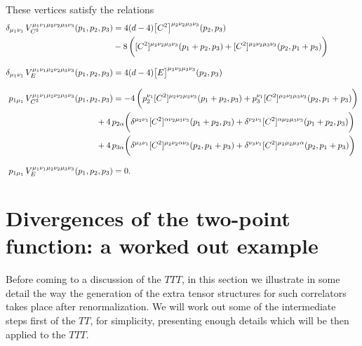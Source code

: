 \documentclass[a4paper,11pt,openright,twoside]{book}
\let\a=\alpha   \let\b=\beta   \let\g=\gamma   \let\d=\delta
\numberwithin{equation}{section}
\begin{document}
{{These vertices satisfy the relations
\begin{align}
	\d_{\mu_1\nu_1}\,V_{C^2}^{\mu_1\nu_1\mu_2\nu_2\mu_3\nu_3}(p_1,p_2,p_3)&=4(d-4)\big[C^2\big]^{\mu_2\nu_2\mu_3\nu_3}(p_2,p_3)\notag\\
	&-8\,\bigg([C^2]^{\mu_2\nu_2\mu_3\nu_3}(p_1+p_2,p_3)+[C^2]^{\mu_2\nu_2\mu_3\nu_3}(p_2,p_1+p_3)\bigg)\\[2ex]
	\d_{\mu_1\nu_1}\,V_{E}^{\mu_1\nu_1\mu_2\nu_2\mu_3\nu_3}(p_1,p_2,p_3)&=4(d-4)\big[E\big]^{\mu_2\nu_2\mu_3\nu_3}(p_2,p_3)\\[2ex]
	p_{1\mu_1}\,V_{C^2}^{\mu_1\nu_1\mu_2\nu_2\mu_3\nu_3}(p_1,p_2,p_3)&=-4\,\bigg(p_2^{\nu_1}[C^2]^{\mu_2\nu_2\mu_3\nu_3}(p_1+p_2,p_3)+p_3^{\nu_1}[C^2]^{\mu_2\nu_2\mu_3\nu_3}(p_2,p_1+p_3)\bigg)\notag\\
	&\hspace{-0.7cm}+4\,p_{2\a}\bigg(\d^{\mu_2\nu_1}[C^2]^{\a\nu_2\mu_3\nu_3}(p_1+p_2,p_3)+\d^{\nu_2\nu_1}[C^2]^{\a\mu_2\mu_3\nu_3}(p_1+p_2,p_3)\bigg)\notag\\
	&\hspace{-0.7cm}+4\,p_{3\a}\bigg(\d^{\mu_3\nu_1}[C^2]^{\mu_2\nu_2\a\nu_3}(p_2,p_1+p_3)+\d^{\nu_3\nu_1}[C^2]^{\mu_2\mu_2\mu_3\a}(p_2,p_1+p_3)\bigg)\\[2ex]
	p_{1\mu_1}\,V_{E}^{\mu_1\nu_1\mu_2\nu_2\mu_3\nu_3}(p_1,p_2,p_3)&=0.
\end{align}


\section{Divergences of the two-point function: a worked out example}
Before coming to a discussion of the $TTT$, in this section we illustrate 
in some detail the way the generation of the extra tensor structures for such correlators takes place after renormalization. 
We will work out some of the intermediate steps first of the $TT$, for simplicity, presenting enough details which will be then applied to the $TTT$. 

}}
\end{document}
